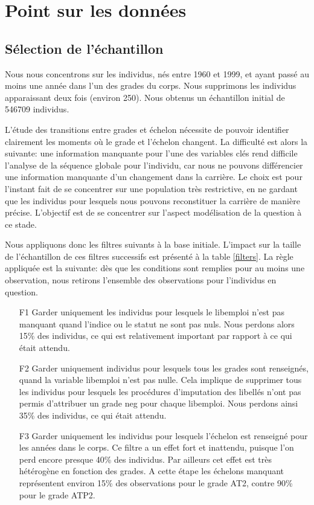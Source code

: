 \documentclass[11pt,a4paper]{article}
\begin{document}
\section{Point sur les données}


\subsection{Sélection de l'échantillon}

Nous nous concentrons sur les individus, nés entre 1960 et 1999, et ayant passé au moins une année dans l'un des grades du corps. Nous supprimons les individus apparaissant deux fois (environ 250). Nous obtenus un échantillon initial de 546709 individus. 

L'étude des transitions entre grades et échelon nécessite de pouvoir identifier clairement les moments où le grade et l'échelon changent. La difficulté est alors la suivante: une information manquante pour l'une des variables clés rend difficile l'analyse de la séquence globale pour l'individu, car nous ne pouvons différencier une information manquante d'un changement dans la carrière. Le choix est pour l'instant fait de se concentrer sur une population très restrictive, en ne gardant que les individus pour lesquels nous pouvons reconstituer la carrière de manière précise. L'objectif est de se concentrer sur l'aspect modélisation de la question à ce stade. 

Nous appliquons donc les filtres suivants à la base initiale. L'impact sur la taille de l'échantillon de ces filtres successifs est présenté à la table \ref{filters}. La règle appliquée est la suivante: dès que les conditions sont remplies pour au moins une observation, nous retirons l'ensemble des observations pour l'individus en question. 
\begin{enumerate}[leftmargin=1cm ,parsep=0cm,itemsep=0cm,topsep=0cm] 
\item[F1] Garder uniquement les individus pour lesquels le libemploi n'est pas manquant quand l'indice ou le statut ne sont pas nuls. Nous perdons alors 15\% des individus, ce qui est relativement important par rapport à ce qui était attendu. 
\item[F2] Garder uniquement individus pour lesquels tous les grades sont renseignés, quand la variable libemploi n'est pas nulle. Cela implique de supprimer tous les individus pour lesquels les procédures d'imputation des libellés n'ont pas permis d'attribuer un grade neg pour chaque libemploi. Nous perdons ainsi 35\% des individus, ce qui était attendu. 
\item[F3] Garder uniquement les individus pour lesquels l'échelon est renseigné pour les années dans le corps. Ce filtre a un effet fort et inattendu, puisque l'on perd encore presque 40\% des individus. Par ailleurs cet effet est très hétérogène en fonction des grades. A cette étape les échelons manquant représentent environ 15\% des observations pour le grade AT2, contre 90\% pour le grade ATP2.
\end{enumerate}
\end{document}
